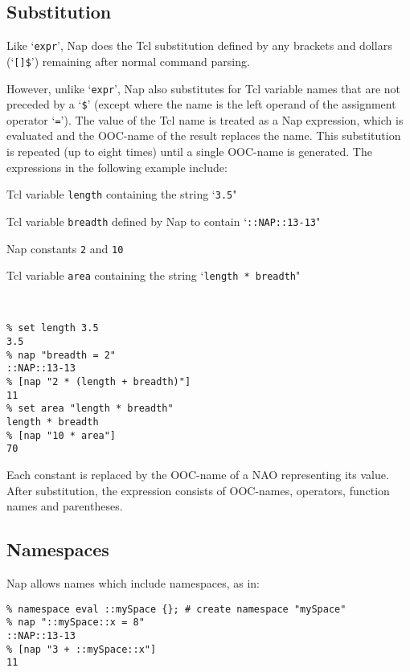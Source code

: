 \subsection{Substitution}

Like `\texttt{expr}', Nap does the Tcl substitution defined by
    any brackets and dollars (`\texttt{[]\$}') remaining after normal command parsing.
    

However, unlike `\texttt{expr}', Nap also substitutes for Tcl variable
    names that are not preceded by a `\texttt{\$}' (except where the name is the left operand of
    the assignment operator `\texttt{=}'). The value of the Tcl name is treated as a
    Nap expression, which is evaluated and the OOC-name of the result
    replaces the name. This substitution is repeated (up to eight
    times) until a single OOC-name is generated. The expressions in the
    following example include:
\begin{bullets}
      \item Tcl variable 
      \texttt{length} containing the string `\texttt{3.5}"
      \item Tcl variable 
      \texttt{breadth} defined by Nap to contain `\texttt{::NAP::13-13}"
      \item Nap constants 
      \texttt{2} and 
      \texttt{10}
      \item Tcl variable 
      \texttt{area} containing the string `\texttt{length * breadth}"
\end{bullets}
    \\
    \begin{verbatim}
% set length 3.5
3.5
% nap "breadth = 2"
::NAP::13-13
% [nap "2 * (length + breadth)"]
11
% set area "length * breadth"
length * breadth
% [nap "10 * area"]
70
\end{verbatim}

    

Each constant is replaced by the OOC-name of a NAO representing
    its value. After substitution, the expression consists of
    OOC-names, operators, function names and parentheses.

\subsection{Namespaces}

Nap allows names which include namespaces, as in:
    \begin{verbatim}
% namespace eval ::mySpace {}; # create namespace "mySpace"
% nap "::mySpace::x = 8"
::NAP::13-13
% [nap "3 + ::mySpace::x"]
11
\end{verbatim}

